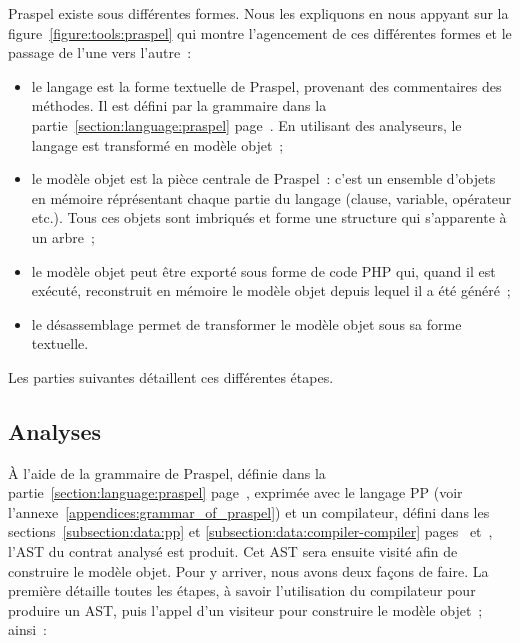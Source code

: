 Praspel existe sous différentes formes. Nous les expliquons en nous appyant sur
la figure~\ref{figure:tools:praspel} qui montre l'agencement de ces différentes
formes et le passage de l'une vers l'autre~:
%
\begin{itemize}

\item le langage est la forme textuelle de Praspel, provenant des commentaires
des méthodes. Il est défini par la grammaire dans la
partie~\ref{section:language:praspel} page~\pageref{section:language:praspel}.
En utilisant des analyseurs, le langage est transformé en modèle objet~;

\item le modèle objet  est la pièce centrale de Praspel~: c'est un
ensemble d'objets en mémoire réprésentant chaque partie du langage (clause,
variable, opérateur etc.). Tous ces objets sont imbriqués et forme une structure
qui s'apparente à un arbre~;

\item le modèle objet peut être exporté sous forme de code PHP qui, quand il est
exécuté, reconstruit en mémoire le modèle objet depuis lequel il a été généré~;

\item le désassemblage permet de transformer le modèle objet sous sa forme
textuelle.

\end{itemize}
%
Les parties suivantes détaillent ces différentes étapes.

\subsection{Analyses}
\label{subsection:tools:interpretation}

À l'aide de la grammaire de Praspel, définie dans la
partie~\ref{section:language:praspel} page~\pageref{section:language:praspel},
exprimée avec le langage PP (voir l'annexe~\ref{appendices:grammar_of_praspel})
et un compilateur, défini dans les sections~\ref{subsection:data:pp} et
\ref{subsection:data:compiler-compiler} pages~\pageref{subsection:data:pp}
et~\pageref{subsection:data:compiler-compiler}, l'AST du contrat analysé est
produit. Cet AST sera ensuite visité afin de construire le modèle objet. Pour y
arriver, nous avons deux façons de faire. La première détaille toutes les
étapes, à savoir l'utilisation du compilateur pour produire un AST, puis l'appel
d'un visiteur pour construire le modèle objet~; ainsi~:

